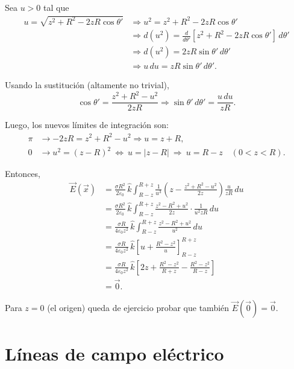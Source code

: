 \begin{ejemplo}
Sea $u > 0$ tal que
\begin{align*}
     u = \sqrt{z^2 + R^2 - 2zR \cos\theta'} & \Rightarrow  u^2 = z^2 + R^2 - 2zR \cos\theta' \\
     &\Rightarrow d(u^2) = \frac{d}{d \theta'} [z^2 + R^2 - 2zR \cos\theta' ] \,d\theta' \\
 & \Rightarrow  d(u^2) = 2zR \sin \theta'\, d\theta' \\
 & \Rightarrow  u\,du = z R \sin \theta'\, d\theta'.
\end{align*}

Usando la sustitución (altamente no trivial),
$$\cos \theta' = \frac{z^2 + R^2 - u^2}{2zR} \Rightarrow \sin \theta'\, d\theta' = \frac{u\,du}{zR}.$$

Luego, los nuevos límites de integración son:
\begin{align*}
    \pi &\longrightarrow -2zR = z^2+R^2 -u^2 \Rightarrow  u = z + R, \\
    0 &\longrightarrow u^2 = (z-R)^2 ~\Leftrightarrow~ u = |z-R| ~\Rightarrow ~ u =  R - z \quad (0 < z < R).
\end{align*}

Entonces, 
\begin{align*}
    \Vec{E}(\Vec{x}) &= \frac{\sigma R^2}{2 \varepsilon_0} \,\hat{k} \int_{R-z}^{R+z} \frac{1}{u^3} \left( z - \frac{z^2+R^2-u^2}{2z}\right) \frac{u}{zR} \,du \\
    &= \frac{\sigma R^2}{2 \varepsilon_0} \,\hat{k} \int_{R-z}^{R+z} \frac{z^2 - R^2 + u^2}{2z} \cdot \frac{1}{u^2 z R} \,du \\
    &= \frac{\sigma R}{4 \varepsilon_0 z^2} \,\hat{k} \int_{R-z}^{R+z} \frac{z^2 - R^2 + u^2}{u^2}  \,du \\
    &= \frac{\sigma R}{4 \varepsilon_0 z^2} \,\hat{k} \left[u + \frac{R^2 - z^2}{u} \right]_{R-z}^{R+z} \\
    &= \frac{\sigma R}{4 \varepsilon_0 z^2} \,\hat{k} \left[2z + \frac{R^2-z^2}{R+z} - \frac{R^2-z^2}{R-z} \right] \\
    &= \Vec{0}.
\end{align*}

Para $z = 0$ (el origen) queda de ejercicio probar que también $\vec{E}(\vec{0}) = \vec{0}$.
\end{ejemplo}
 
\section{Líneas de campo eléctrico}

